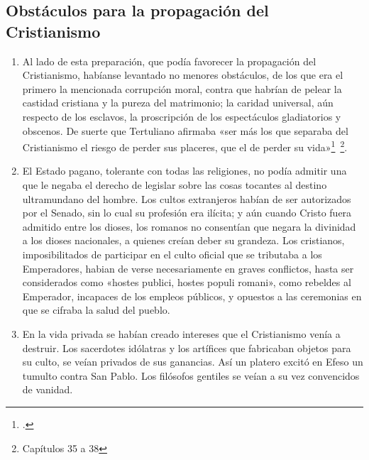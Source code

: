\raggedbottom{} \documentclass[12pt, a4paper, openany]{book} %
\begin{document}
\subsection{Obstáculos para la propagación del Cristianismo}
\begin{enumerate}
  \item Al lado de esta preparación, que podía favorecer la propagación del Cristianismo, habíanse levantado no menores obstáculos, de los que era el primero la mencionada corrupción moral, contra que habrían de pelear la castidad cristiana y la pureza del matrimonio; la caridad universal, aún respecto de los esclavos, la proscripción de los espectáculos gladiatorios y obscenos. De suerte que Tertuliano afirmaba «ser más los que separaba del Cristianismo el riesgo de perder sus placeres, que el de perder su vida»\footcites{Tertuliano202Spectaculis}{Tertuliano197Apologeticum}{Origenes248ContraCelsum}~\footnote{\cite{Tertuliano197Apologeticum} Capítulos 35 a 38}.
  \item El Estado pagano, tolerante con todas las religiones, no podía admitir una que le negaba el derecho de legislar sobre las cosas tocantes al destino ultramundano del hombre. Los cultos extranjeros habían de ser autorizados por el Senado, sin lo cual su profesión era ilícita; y aún cuando Cristo fuera admitido entre los dioses, los romanos no consentían que negara la divinidad a los dioses nacionales, a quienes creían deber su grandeza. Los cristianos, imposibilitados de participar en el culto oficial que se tributaba a los Emperadores, habian de verse necesariamente en graves conflictos, hasta ser considerados como «hostes publici, hostes populi romani», como rebeldes al Emperador, incapaces de los empleos públicos, y opuestos a las ceremonias en que se cifraba la salud del pueblo.
  \item En la vida privada se habían creado intereses que el Cristianismo venía a destruir. Los sacerdotes idólatras y los artífices que fabricaban objetos para su culto, se veían privados de sus ganancias. Así un platero excitó en Efeso un tumulto contra San Pablo. Los filósofos gentiles se veían a su vez convencidos de vanidad.

\end{enumerate}
\end{document}
